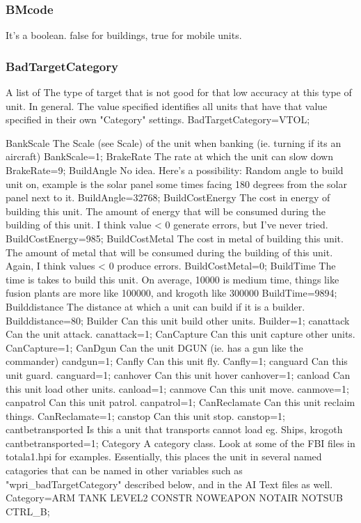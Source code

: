 \documentclass[a4paper,10pt]{article}
\begin{document}
\subsubsection{BMcode}
It's a boolean. false for buildings, true for mobile units.

\subsubsection{BadTargetCategory}
A list of 
The type of target that is not good for that low accuracy at this type of unit. In general.  The value specified identifies all units that have that value specified in their own "Category" settings. 	BadTargetCategory=VTOL;

BankScale 	The Scale (see Scale) of the unit when banking (ie. turning if its an aircraft) 	BankScale=1;
BrakeRate 	The rate at which the unit can slow down 	BrakeRate=9;
BuildAngle 	No idea. Here's a possibility:  Random angle to build unit on, example is the solar panel some times facing 180 degrees from the solar panel next to it.  	BuildAngle=32768;
BuildCostEnergy 	The cost in energy of building this unit.  The amount of energy that will be consumed during the building of this unit. I think value < 0 generate errors, but I've never tried.   	BuildCostEnergy=985;
BuildCostMetal 	The cost in metal of building this unit.  The amount of metal that will be consumed during the building of this unit. Again, I think values < 0 produce errors.   	BuildCostMetal=0;
BuildTime 	The time is takes to build this unit. On average, 10000 is medium time, things like fusion plants are more like 100000, and krogoth like 300000 	BuildTime=9894;
Builddistance 	The distance at which a unit can build if it is a builder. 	Builddistance=80;
Builder 	Can this unit build other units. 	Builder=1;
canattack 	Can the unit attack. 	canattack=1;
CanCapture 	Can this unit capture other units. 	CanCapture=1;
CanDgun 	Can the unit DGUN (ie. has a gun like the commander) 	candgun=1;
Canfly 	Can this unit fly. 	Canfly=1;
canguard 	Can this unit guard. 	canguard=1;
canhover 	Can this unit hover 	canhover=1;
canload 	Can this unit load other units. 	canload=1;
canmove 	Can this unit move. 	canmove=1;
canpatrol 	Can this unit patrol. 	canpatrol=1;
CanReclamate 	Can this unit reclaim things. 	CanReclamate=1;
canstop 	Can this unit stop. 	canstop=1;
cantbetransported 	Is this a unit that transports cannot load eg. Ships, krogoth 	cantbetransported=1;
Category 	A category class. Look at some of the FBI files in totala1.hpi for examples.  Essentially, this places the unit in several named catagories that can be named in other variables such as "wpri\_badTargetCategory" described below, and in the AI Text files as well. 	Category=ARM TANK LEVEL2 CONSTR NOWEAPON NOTAIR NOTSUB CTRL\_B;
\end{document}
